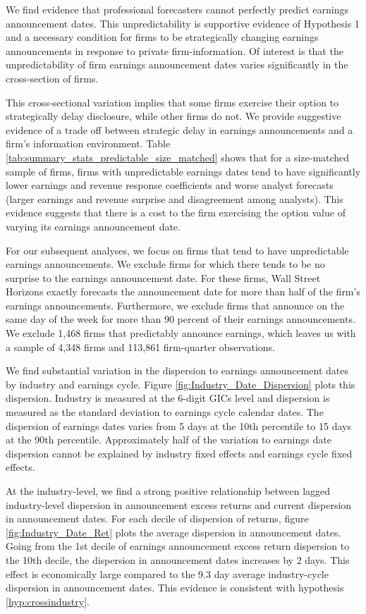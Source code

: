 \documentclass[authoryear,letterpaper,english,12pt]{elsarticle}
\begin{document}
We find evidence that professional forecasters cannot perfectly predict earnings announcement dates. This unpredictability is supportive evidence of Hypothesis 1 and a necessary condition for firms to be strategically changing earnings announcements in response to private firm-information. Of interest is that the unpredictability of firm earnings announcement dates varies significantly in the cross-section of firms. 

This cross-sectional variation implies that some firms exercise their option to strategically delay disclosure, while other firms do not. We provide suggestive evidence of a trade off between strategic delay in earnings announcements and a firm's information environment. Table \ref{tab:summary_stats_predictable_size_matched} shows that for a size-matched sample of firms, firms with unpredictable earnings dates tend to have significantly lower earnings and revenue response coefficients and worse analyst forecasts (larger earnings and revenue surprise and disagreement among analysts). This evidence suggests that there is a cost to the firm exercising the option value of varying its earnings announcement date. 

For our subsequent analyses, we focus on firms that tend to have unpredictable earnings announcements. We exclude firms for which there tends to be no surprise to the earnings announcement date. For these firms, Wall Street Horizons exactly forecasts the announcement date for more than half of the firm's earnings announcements. Furthermore, we exclude firms that announce on the same day of the week for more than 90 percent of their earnings announcements. We exclude 1,468 firms that predictably announce earnings, which leaves us with a sample of 4,348 firms and 113,861 firm-quarter observations. 

We find substantial variation in the dispersion to earnings announcement dates by industry and earnings cycle. Figure \ref{fig:Industry_Date_Dispersion} plots this dispersion. Industry is measured at the 6-digit GICs level and dispersion is measured as the standard deviation to earnings cycle calendar dates. The dispersion of earnings dates varies from 5 days at the 10th percentile to 15 days at the 90th percentile. Approximately half of the variation to earnings date dispersion cannot be explained by industry fixed effects and earnings cycle fixed effects.

At the industry-level, we find a strong positive relationship between lagged industry-level dispersion in announcement excess returns and current dispersion in announcement dates. For each decile of dispersion of returns, figure \ref{fig:Industry_Date_Ret} plots the average dispersion in announcement dates. Going from the 1st decile of earnings announcement excess return dispersion to the 10th decile, the dispersion in announcement dates increases by 2 days. This effect is economically large compared to the 9.3 day average industry-cycle dispersion in announcement dates. This evidence is consistent with hypothesis \ref{hyp:crossindustry}. 
\end{document}
